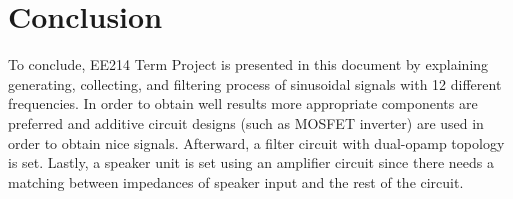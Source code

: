 \documentclass[letterpaper,12pt]{article}
\begin{document}
\section{Conclusion}
To conclude, EE214 Term Project is presented in this document by explaining generating, collecting, and filtering process of sinusoidal signals with 12 different frequencies. In order to obtain well results more appropriate components are preferred and additive circuit designs (such as MOSFET inverter) are used in order to obtain nice signals. Afterward, a filter circuit with dual-opamp topology is set. Lastly, a speaker unit is set using an amplifier circuit since there needs a matching between impedances of speaker input and the rest of the circuit.    
\end{document}
